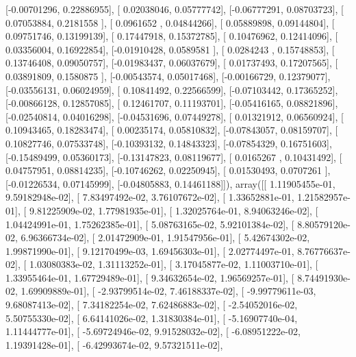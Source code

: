 \documentclass{article}
\begin{document}
       [-0.00701296,  0.22886955],
       [ 0.02038046,  0.05777742],
       [-0.06777291,  0.08703723],
       [ 0.07053884,  0.2181558 ],
       [ 0.0961652 ,  0.04844266],
       [ 0.05889898,  0.09144804],
       [ 0.09751746,  0.13199139],
       [ 0.17447918,  0.15372785],
       [ 0.10476962,  0.12414096],
       [ 0.03356004,  0.16922854],
       [-0.01910428,  0.0589581 ],
       [ 0.0284243 ,  0.15748853],
       [ 0.13746408,  0.09050757],
       [-0.01983437,  0.06037679],
       [ 0.01737493,  0.17207565],
       [ 0.03891809,  0.1580875 ],
       [-0.00543574,  0.05017468],
       [-0.00166729,  0.12379077],
       [-0.03556131,  0.06024959],
       [ 0.10841492,  0.22566599],
       [-0.07103442,  0.17365252],
       [-0.00866128,  0.12857085],
       [ 0.12461707,  0.11193701],
       [-0.05416165,  0.08821896],
       [-0.02540814,  0.04016298],
       [-0.04531696,  0.07449278],
       [ 0.01321912,  0.06560924],
       [ 0.10943465,  0.18283474],
       [ 0.00235174,  0.05810832],
       [-0.07843057,  0.08159707],
       [ 0.10827746,  0.07533748],
       [-0.10393132,  0.14843323],
       [-0.07854329,  0.16751603],
       [-0.15489499,  0.05360173],
       [-0.13147823,  0.08119677],
       [ 0.0165267 ,  0.10431492],
       [ 0.04757951,  0.08814235],
       [-0.10746262,  0.02250945],
       [ 0.01530493,  0.0707261 ],
       [-0.01226534,  0.07145999],
       [-0.04805883,  0.14461188]]), array([[  1.11905455e-01,   9.59182948e-02],
       [  7.83497492e-02,   3.76107672e-02],
       [  1.33652881e-01,   1.21582957e-01],
       [  9.81225909e-02,   1.77981935e-01],
       [  1.32025764e-01,   8.94063246e-02],
       [  1.04424991e-01,   1.75262385e-01],
       [  5.08763165e-02,   5.92101384e-02],
       [  8.80579120e-02,   6.96366734e-02],
       [  2.01472909e-01,   1.91547956e-01],
       [  5.42674302e-02,   1.99871990e-01],
       [  9.12170499e-03,   1.69456303e-01],
       [  2.02774497e-01,   8.76776637e-02],
       [  1.03080383e-02,   1.31113252e-01],
       [  3.17045877e-02,   1.11003710e-01],
       [  1.33955464e-01,   1.67729489e-01],
       [  9.34632654e-02,   1.96569257e-01],
       [  8.74491930e-02,   1.69909889e-01],
       [ -2.93799514e-02,   7.46188337e-02],
       [ -9.99779611e-03,   9.68087413e-02],
       [  7.34182254e-02,   7.62486883e-02],
       [ -2.54052016e-02,   5.50755330e-02],
       [  6.64141026e-02,   1.31830384e-01],
       [ -5.16907740e-04,   1.11444777e-01],
       [ -5.69724946e-02,   9.91528032e-02],
       [ -6.08951222e-02,   1.19391428e-01],
       [ -6.42993674e-02,   9.57321511e-02],
\end{document}
